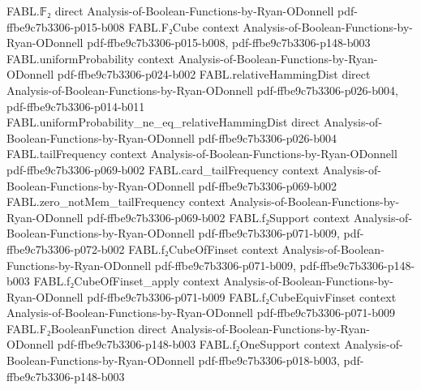 \begin{theorem}
\label{FABL.inv_two_pow_le_uniformProbability_ne_zero_of_functionAlgebraicDegree_le}
\leanok
{}
\proofstep
  {FABL.𝔽₂}
  {direct}
  {Analysis-of-Boolean-Functions-by-Ryan-ODonnell}
  {pdf-ffbe9c7b3306-p015-b008}
\proofstep
  {FABL.F₂Cube}
  {context}
  {Analysis-of-Boolean-Functions-by-Ryan-ODonnell}
  {pdf-ffbe9c7b3306-p015-b008,
    pdf-ffbe9c7b3306-p148-b003}
\proofstep
  {FABL.uniformProbability}
  {context}
  {Analysis-of-Boolean-Functions-by-Ryan-ODonnell}
  {pdf-ffbe9c7b3306-p024-b002}
\proofstep
  {FABL.relativeHammingDist}
  {direct}
  {Analysis-of-Boolean-Functions-by-Ryan-ODonnell}
  {pdf-ffbe9c7b3306-p026-b004,
    pdf-ffbe9c7b3306-p014-b011}
\proofstep
  {FABL.uniformProbability_ne_eq_relativeHammingDist}
  {direct}
  {Analysis-of-Boolean-Functions-by-Ryan-ODonnell}
  {pdf-ffbe9c7b3306-p026-b004}
\proofstep
  {FABL.tailFrequency}
  {context}
  {Analysis-of-Boolean-Functions-by-Ryan-ODonnell}
  {pdf-ffbe9c7b3306-p069-b002}
\proofstep
  {FABL.card_tailFrequency}
  {context}
  {Analysis-of-Boolean-Functions-by-Ryan-ODonnell}
  {pdf-ffbe9c7b3306-p069-b002}
\proofstep
  {FABL.zero_notMem_tailFrequency}
  {context}
  {Analysis-of-Boolean-Functions-by-Ryan-ODonnell}
  {pdf-ffbe9c7b3306-p069-b002}
\proofstep
  {FABL.f₂Support}
  {context}
  {Analysis-of-Boolean-Functions-by-Ryan-ODonnell}
  {pdf-ffbe9c7b3306-p071-b009,
    pdf-ffbe9c7b3306-p072-b002}
\proofstep
  {FABL.f₂CubeOfFinset}
  {context}
  {Analysis-of-Boolean-Functions-by-Ryan-ODonnell}
  {pdf-ffbe9c7b3306-p071-b009,
    pdf-ffbe9c7b3306-p148-b003}
\proofstep
  {FABL.f₂CubeOfFinset_apply}
  {context}
  {Analysis-of-Boolean-Functions-by-Ryan-ODonnell}
  {pdf-ffbe9c7b3306-p071-b009}
\proofstep
  {FABL.f₂CubeEquivFinset}
  {context}
  {Analysis-of-Boolean-Functions-by-Ryan-ODonnell}
  {pdf-ffbe9c7b3306-p071-b009}
\proofstep
  {FABL.F₂BooleanFunction}
  {direct}
  {Analysis-of-Boolean-Functions-by-Ryan-ODonnell}
  {pdf-ffbe9c7b3306-p148-b003}
\proofstep
  {FABL.f₂OneSupport}
  {context}
  {Analysis-of-Boolean-Functions-by-Ryan-ODonnell}
  {pdf-ffbe9c7b3306-p018-b003,
    pdf-ffbe9c7b3306-p148-b003}

\end{theorem}
